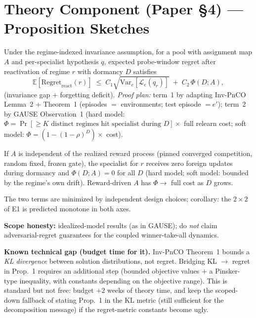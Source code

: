 \documentclass[11pt]{article}
\begin{document}
\section{Theory Component (Paper \S4) --- Proposition Sketches}\label{sec:theory}
\begin{description}[leftmargin=1.6em]
  \item[Prop.~1 (Regret decomposition).] Under the regime-indexed invariance assumption, for a pool with assignment map $A$ and per-specialist hypothesis $q$, expected probe-window regret after reactivation of regime $r$ with dormancy $D$ satisfies
  \[
    \mathbb E\!\left[\mathrm{Regret}_{\text{react}}(r)\right] \;\le\; C_1 \sqrt{\mathrm{Var}_e\!\left[\mathcal L_e(q_r)\right]} \;+\; C_2\,\Phi(D; A),
  \]
  (invariance gap $+$ forgetting deficit). \emph{Proof plan:} term~1 by adapting Inv-PnCO Lemma~2 $+$ Theorem~1 (episodes $=$ environments; test episode $=e'$); term~2 by GAUSE Observation~1 (hard model: $\Phi = \Pr[\ge K \text{ distinct regimes hit specialist during } D]\times$ full relearn cost; soft model: $\Phi = (1-(1-\rho)^D)\times$ cost).
  \item[Prop.~2 (Reward-independence zeroes forgetting).] If $A$ is independent of the realized reward process (pinned converged competition, random fixed, frozen gate), the specialist for $r$ receives zero foreign updates during dormancy and $\Phi(D;A)=0$ for all $D$ (hard model; soft model: bounded by the regime's own drift). Reward-driven $A$ has $\Phi\to$ full cost as $D$ grows.
  \item[Prop.~3 (Interaction).] The two terms are minimized by independent design choices; corollary: the $2\times2$ of E1 is predicted monotone in both axes.
\end{description}
\noindent\textbf{Scope honesty:} idealized-model results (as in GAUSE); do \emph{not} claim adversarial-regret guarantees for the coupled winner-take-all dynamics.

\medskip\noindent\textbf{Known technical gap (budget time for it).} Inv-PnCO Theorem~1 bounds a \emph{KL divergence} between solution distributions, not regret. Bridging KL $\to$ regret in Prop.~1 requires an additional step (bounded objective values $+$ a Pinsker-type inequality, with constants depending on the objective range). This is standard but not free: budget $+2$ weeks of theory time, and keep the scoped-down fallback of stating Prop.~1 in the KL metric (still sufficient for the decomposition message) if the regret-metric constants become ugly.
\end{document}
